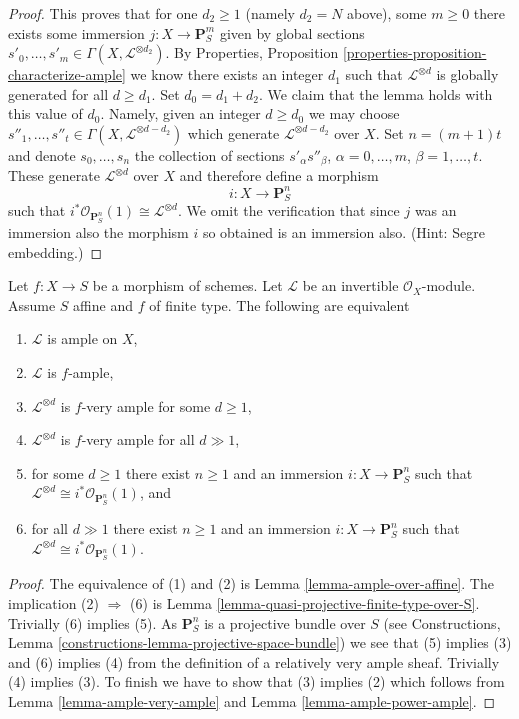 \begin{proof}
\medskip\noindent
This proves that for one $d_2 \geq 1$
(namely $d_2 = N$ above), some $m \geq 0$ there exists some
immersion $j : X \to \mathbf{P}^m_S$ given by global sections
$s'_0, \ldots, s'_m \in \Gamma(X, \mathcal{L}^{\otimes d_2})$.
By Properties, Proposition \ref{properties-proposition-characterize-ample}
we know there exists an integer
$d_1$ such that $\mathcal{L}^{\otimes d}$ is globally generated
for all $d \geq d_1$. Set $d_0 = d_1 + d_2$. We claim that
the lemma holds with this value of $d_0$. Namely, given
an integer $d \geq d_0$ we may choose $s''_1, \ldots, s''_t
\in \Gamma(X, \mathcal{L}^{\otimes d - d_2})$ which generate
$\mathcal{L}^{\otimes d - d_2}$ over $X$. Set $n = (m + 1)t$ and
denote $s_0, \ldots, s_n$ the collection of sections
$s'_\alpha s''_\beta$, $\alpha = 0, \ldots, m$, 
$\beta = 1, \ldots, t$. These generate $\mathcal{L}^{\otimes d}$
over $X$ and therefore define a morphism
$$
i : X \longrightarrow \mathbf{P}^n_S
$$
such that $i^*\mathcal{O}_{\mathbf{P}^n_S}(1) \cong \mathcal{L}^{\otimes d}$.
We omit the verification that since $j$ was an immersion
also the morphism $i$ so obtained is an immersion also.
(Hint: Segre embedding.)
\end{proof}

\begin{lemma}
\label{lemma-finite-type-over-affine-ample-very-ample}
Let $f : X \to S$ be a morphism of schemes.
Let $\mathcal{L}$ be an invertible $\mathcal{O}_X$-module.
Assume $S$ affine and $f$ of finite type.
The following are equivalent
\begin{enumerate}
\item $\mathcal{L}$ is ample on $X$,
\item $\mathcal{L}$ is $f$-ample,
\item $\mathcal{L}^{\otimes d}$ is $f$-very ample for some $d \geq 1$,
\item $\mathcal{L}^{\otimes d}$ is $f$-very ample for all $d \gg 1$,
\item for some $d \geq 1$ there exist $n \geq 1$ and an immersion
$i : X \to \mathbf{P}^n_S$ such that
$\mathcal{L}^{\otimes d} \cong i^*\mathcal{O}_{\mathbf{P}^n_S}(1)$, and
\item for all $d \gg 1$ there exist $n \geq 1$ and an immersion
$i : X \to \mathbf{P}^n_S$ such that
$\mathcal{L}^{\otimes d} \cong i^*\mathcal{O}_{\mathbf{P}^n_S}(1)$.
\end{enumerate}
\end{lemma}

\begin{proof}
The equivalence of (1) and (2) is Lemma \ref{lemma-ample-over-affine}.
The implication (2) $\Rightarrow$ (6) is
Lemma \ref{lemma-quasi-projective-finite-type-over-S}.
Trivially (6) implies (5).
As $\mathbf{P}^n_S$ is a projective bundle over $S$ (see
Constructions, Lemma \ref{constructions-lemma-projective-space-bundle})
we see that
(5) implies (3) and (6) implies (4) from the definition of a
relatively very ample sheaf.
Trivially (4) implies (3). To finish we have to show that
(3) implies (2) which follows from Lemma \ref{lemma-ample-very-ample}
and Lemma \ref{lemma-ample-power-ample}.
\end{proof}

